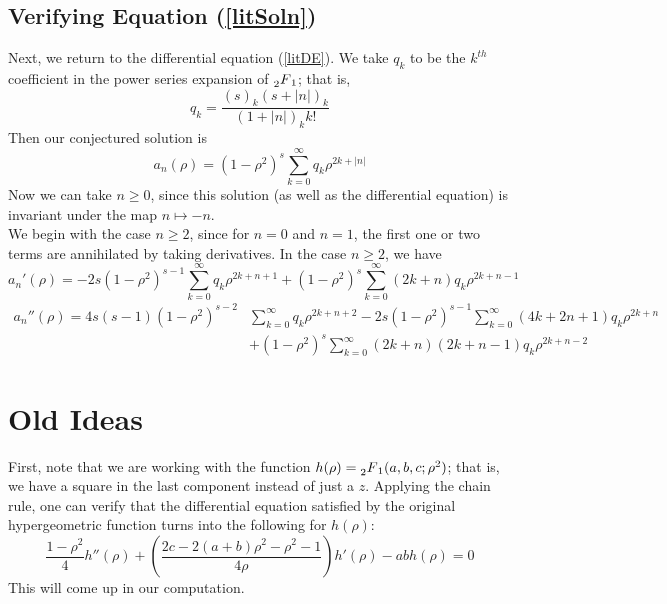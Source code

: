\documentclass[]{article}
\begin{document}
\subsection*{Verifying Equation (\ref{litSoln})}

Next, we return to the differential equation (\ref{litDE}).
We take $q_k$ to be the $k^{th}$ coefficient in the power series expansion of $\prescript{}{2}{F}_1$; that is,
$$
q_k = \frac{(s)_k(s+|n|)_k}{(1+|n|)_kk!}
$$
Then our conjectured solution is
$$
a_n(\rho) = (1 - \rho^2)^s \sum_{k=0}^{\infty}q_k\rho^{2k + |n|}
$$
Now we can take $n \geq 0$, since this solution (as well as the differential equation) is invariant under the map $n \mapsto -n$.
\\

We begin with the case $n \geq 2$, since for $n = 0$ and $n = 1$, the first one or two terms are annihilated by taking derivatives.
In the case $n \geq 2$, we have
$$
a_n'(\rho) = -2s(1 - \rho^2)^{s-1}\sum_{k=0}^{\infty}q_k\rho^{2k+n+1} +
(1 - \rho^2)^s\sum_{k=0}^{\infty}(2k+n)q_k\rho^{2k+n-1} $$$$
\begin{aligned}
a_n''(\rho) = 4s(s-1)(1-\rho^2)^{s-2}&\sum_{k=0}^{\infty}q_k\rho^{2k+n+2}
-2s(1 - \rho^2)^{s-1}\sum_{k=0}^{\infty}(4k+2n+1)q_k\rho^{2k+n} \\
&+ (1 - \rho^2)^s\sum_{k=0}^{\infty}(2k+n)(2k+n-1)q_k\rho^{2k+n-2}
\end{aligned}
$$

\section*{Old Ideas}

First, note that we are working with the function $h(\rho) = \prescript{}{2}{F}_1(a, b, c; \rho^2)$; that is, we have a square in the last component instead of just a $z$.
Applying the chain rule, one can verify that the differential equation satisfied by the original hypergeometric function turns into the following for $h(\rho)$:
\begin{equation}\label{scaledHyperDE}
\frac{1-\rho^2}{4}h''(\rho) + \left( \frac{2c - 2(a+b)\rho^2 - \rho^2 - 1}{4\rho} \right)h'(\rho) - abh(\rho) = 0
\end{equation}
This will come up in our computation.
\end{document}
